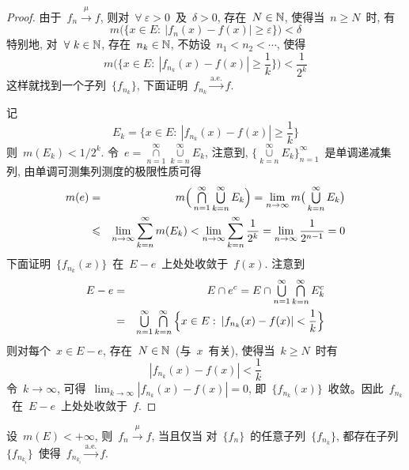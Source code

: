 \begin{proof}
由于~$f_n \xrightarrow{~\mu~} f$, 则对~$\forall~\varepsilon > 0$~及~$\delta > 0$, 存在~$N \in \mathbb{N}$, 使得当~$n \geqslant N$~时, 有
\[
m\big( \{ x \in E: \: |f_n(x) - f(x)| \geqslant \varepsilon \} \big) < \delta
\]
特别地, 对~$\forall~k \in \mathbb{N}$, 存在~$n_k \in \mathbb{N}$, 不妨设~$n_1 < n_2 < \cdots$, 使得
\[
m\Big( \Big\{ x \in E: \: |f_{n_k}(x) - f(x)| \geqslant \frac{1}{k} \Big\} \Big) < \frac{1}{2^k}
\]
这样就找到一个子列~$\{f_{n_k}\}$, 下面证明~$f_{n_k} \xrightarrow{\mathrm{a.e.}} f$.

记
\[
E_k = \big\{ x \in E: \: |f_{n_k}(x) - f(x)| \geqslant \frac{1}{k} \big\}
\]
则~$m(E_k)<1/2^k$. 令~$e = \mathop{\cap}\limits_{n=1}^\infty \mathop{\cup}\limits_{k=n}^\infty E_k$, 注意到, $\big\{ \mathop{\cup}\limits_{k=n}^\infty E_k \big\}_{n=1}^\infty$~是单调递减集列,
由单调可测集列测度的极限性质可得
\begin{eqnarray*}
m(e) &=& m \Big(\mathop{\textstyle{\bigcap}}\limits_{n=1}^\infty \mathop{\textstyle{\bigcup}}\limits_{k=n}^\infty E_k \Big) = \lim_{n \to \infty} m \big( \mathop{\textstyle{\bigcup}}\limits_{k=n}^\infty E_k \big) \\
&\leqslant& \lim_{n \to \infty} \sum_{k=n}^\infty m(E_k) < \lim_{n \to \infty} \sum_{k=n}^\infty \frac{1}{2^k} = \lim_{n \to \infty} \frac{1}{2^{n-1}} = 0
\end{eqnarray*}
下面证明~$\{f_{n_k}(x)\}$~在~$E - e$~上处处收敛于~$f(x)$. 注意到
\begin{eqnarray*}
E - e &=& E \cap e^c = E \cap \mathop{\textstyle{\bigcup}}\limits_{n=1}^\infty \mathop{\textstyle{\bigcap}}\limits_{k=n}^\infty E^c_k \\
&=& \mathop{\textstyle{\bigcup}}\limits_{n=1}^\infty \mathop{\textstyle{\bigcap}}\limits_{k=n}^\infty \Big\{ x \in E: \: |f_{n_k}(x) - f(x)| < \frac{1}{k} \Big\}
\end{eqnarray*}
则对每个~$x \in E - e$, 存在~$N \in \mathbb{N}$~(与~$x$~有关), 使得当~$k \geqslant N$~时有
\[
|f_{n_k}(x) - f(x)| < \frac{1}{k}
\]
令~$k \to \infty$, 可得~$\lim_{k \to \infty} |f_{n_k}(x) - f(x)| = 0$, 即~$\{f_{n_k}(x)\}$~收敛。因此~$f_{n_k}$~在~$E-e$~上处处收敛于~$f$.
\end{proof}

\begin{corollary} \label{cor321}
设~$m(E) < + \infty$, 则~$f_n \xrightarrow{~\mu~} f$, 当且仅当
对~$\{f_n\}$~的任意子列~$\{f_{n_k}\}$, 都存在子列~$\{f_{n_{k_i}}\}$~使得~$f_{n_{k_i}} \xrightarrow{\mathrm{a.e.}} f$.
\end{corollary}

